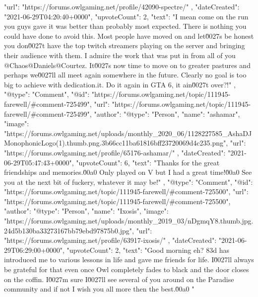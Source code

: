 {{{                "url": "https://forums.owlgaming.net/profile/42090-spectre/"
            },
            "dateCreated": "2021-06-29T04:20:40+0000",
            "upvoteCount": 2,
            "text": "I mean come on the run you guys gave it was better than probably most expected. There is nothing you could have done to avoid this. Most people have moved on and let\u0027s be honest you don\u0027t have the top twitch streamers playing on the server and bringing their audience with them. I admire the work that was put in from all of you @Chaos@Daniels@Courtez. It\u0027s now time to move on to greater pastures and perhaps we\u0027ll all meet again somewhere in the future. Clearly no goal is too big to achieve with dedication.\n \n\n\tFuck it. Do it again in GTA 6, it ain\u0027t over?!\n \n"
        },
        {
            "@type": "Comment",
            "@id": "https://forums.owlgaming.net/topic/111945-farewell/#comment-725499",
            "url": "https://forums.owlgaming.net/topic/111945-farewell/#comment-725499",
            "author": {
                "@type": "Person",
                "name": "ashamar",
                "image": "https://forums.owlgaming.net/uploads/monthly_2020_06/1128227585_AshaDJMonophonicLogo(1).thumb.png.3b66cc11ba61816bff23720069d4c235.png",
                "url": "https://forums.owlgaming.net/profile/65176-ashamar/"
            },
            "dateCreated": "2021-06-29T05:47:43+0000",
            "upvoteCount": 6,
            "text": "Thanks for the great friendships and memories.\u00a0 Only played on V but I had a great time!\u00a0 See you at the next bit of fuckery, whatever it may be!\n \n"
        },
        {
            "@type": "Comment",
            "@id": "https://forums.owlgaming.net/topic/111945-farewell/#comment-725500",
            "url": "https://forums.owlgaming.net/topic/111945-farewell/#comment-725500",
            "author": {
                "@type": "Person",
                "name": "Ixosis",
                "image": "https://forums.owlgaming.net/uploads/monthly_2019_03/nDgmqY8.thumb.jpg.24d5b130ba33273167bb79ebd97875b0.jpg",
                "url": "https://forums.owlgaming.net/profile/63917-ixosis/"
            },
            "dateCreated": "2021-06-29T06:29:00+0000",
            "upvoteCount": 2,
            "text": "Good morning eh? \ud83d  \n\tOwlGaming has introduced me to various lessons in life and gave me friends for life. I\u0027ll always be grateful for that even once Owl completely fades to black and the door closes on the coffin. I\u0027m sure I\u0027ll see several of you around on the Paradise community and if not I wish you all more then the best.\u00a0   \n"
}}
